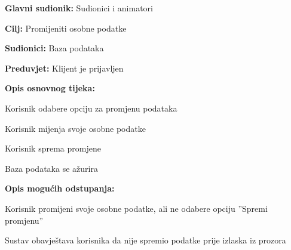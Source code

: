 \noindent {}
\begin{packed_item}

	\item \textbf{Glavni sudionik: }Sudionici i animatori
	\item  \textbf{Cilj:} Promijeniti osobne podatke
	\item  \textbf{Sudionici:} Baza podataka
	\item  \textbf{Preduvjet:} Klijent je prijavljen
	\item  \textbf{Opis osnovnog tijeka:}

	\item[] \begin{packed_enum}

				\item Korisnik odabere opciju za promjenu podataka
				\item Korisnik mijenja svoje osobne podatke
				\item Korisnik sprema promjene
				\item Baza podataka se ažurira
	\end{packed_enum}

	\item  \textbf{Opis mogućih odstupanja:}

	\item[] \begin{packed_item}

				\item[2.a] Korisnik promijeni svoje osobne podatke, ali ne odabere opciju ”Spremi promjenu”
				\item[] \begin{packed_enum}

							\item Sustav obavještava korisnika da nije spremio podatke prije izlaska iz prozora


				\end{packed_enum}


	\end{packed_item}
\end{packed_item}

\vspace{5mm} %

